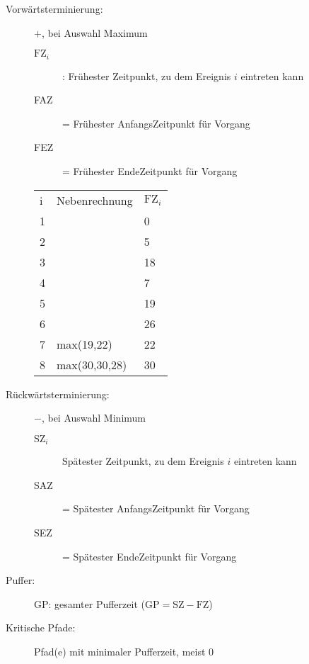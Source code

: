 \documentclass{lehramt-informatik-haupt}
\begin{document}
\begin{description}

%

\item[Vorwärtsterminierung:] $+$, bei Auswahl Maximum

\begin{description}
\item[$\text{FZ}_i$] : Frühester Zeitpunkt, zu dem Ereignis $i$ eintreten kann
\item[FAZ] = Frühester AnfangsZeitpunkt für Vorgang
\item[FEZ] = Frühester EndeZeitpunkt für Vorgang
\end{description}

\begin{tabular}{|l|l|l|}
i & Nebenrechnung & $\text{FZ}_i$ \\
1 &               & 0 \\
2 &               & 5 \\
3 &               & 18 \\
4 &               & 7 \\
5 &               & 19 \\
6 &               & 26 \\
7 & max(19,22)    & 22 \\
8 & max(30,30,28) & 30 \\
\end{tabular}

%

\item[Rückwärtsterminierung:] $-$, bei Auswahl Minimum

\begin{description}
\item[$\text{SZ}_i$] Spätester Zeitpunkt, zu dem Ereignis $i$ eintreten kann
\item[SAZ] = Spätester AnfangsZeitpunkt für Vorgang
\item[SEZ] = Spätester EndeZeitpunkt für Vorgang
\end{description}

%

\item[Puffer:]

GP: gesamter Pufferzeit ($\text{GP} = \text{SZ} - \text{FZ}$)

%

\item[Kritische Pfade:]
Pfad(e) mit minimaler Pufferzeit, meist $0$

\end{description}
\end{document}
